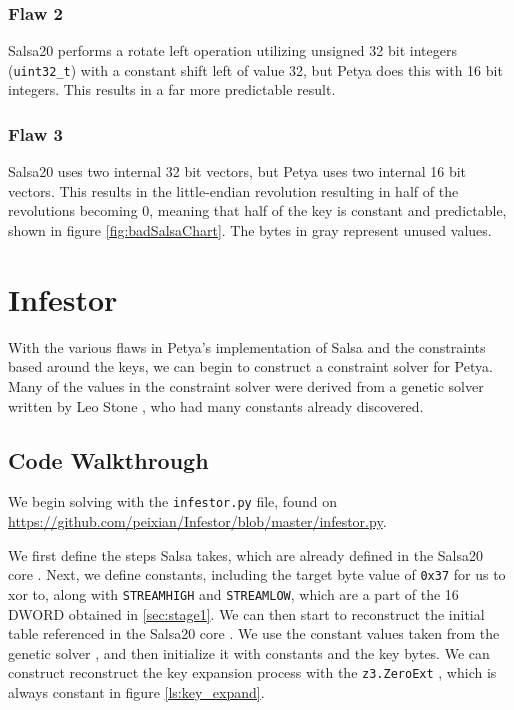 \documentclass[twocolumn]{article}
\newcommand{\code}[1]{\texttt{#1}}
\begin{document}
\subsubsection{Flaw 2}
Salsa20 performs a rotate left operation utilizing unsigned 32 bit integers (\code{uint32\_t}) \cite{salsa20} with a constant shift left of value 32, but Petya does this with 16 bit integers. This results in a far more predictable result.

\subsubsection{Flaw 3}
Salsa20 uses two internal 32 bit vectors, but Petya uses two internal 16 bit vectors. This results in the little-endian revolution resulting in half of the revolutions becoming 0, meaning that half of the key is constant and predictable, shown in figure \ref{fig:badSalsaChart}. The bytes in gray represent unused values. 


\section{Infestor}
\label{sec:infestor}
With the various flaws in Petya's implementation of Salsa and the constraints based around the keys, we can begin to construct a constraint solver for Petya. Many of the values in the constraint solver were derived from a genetic solver written by Leo Stone \cite{geneticSolver}, who had many constants already discovered.

\subsection{Code Walkthrough}

We begin solving with the \code{infestor.py} file, found on \url{https://github.com/peixian/Infestor/blob/master/infestor.py}.

We first define the steps Salsa takes, which are already defined in the Salsa20 core \cite{salsa20Core}. Next, we define constants, including the target byte value of \code{0x37} for us to xor to, along with \code{STREAMHIGH} and \code{STREAMLOW}, which are a part of the 16 DWORD obtained in \ref{sec:stage1}. We can then start to reconstruct the initial table referenced in the Salsa20 core \cite{salsa20Core}. We use the constant values taken from the genetic solver \cite{geneticSolver}, and then initialize it with constants and the key bytes. We can construct reconstruct the key expansion process with the \code{z3.ZeroExt} \cite{z3Guide}, which is always constant in figure \ref{ls:key_expand}. 
\end{document}
